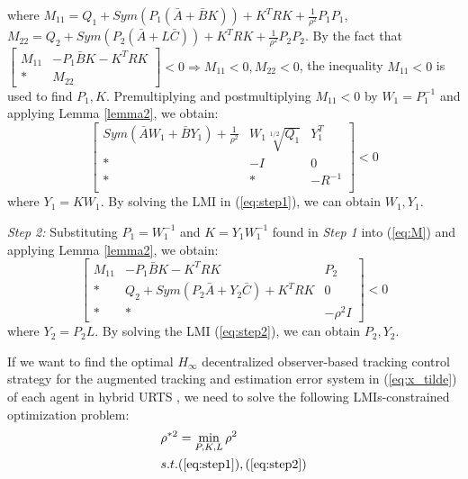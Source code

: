 \documentclass{ieeeaccess}
\begin{document}
where $M_{11}=Q_1+Sym(P_1(\bar{A}+\bar{B}K)) + K^TRK + \frac{1}{\rho^2}P_1P_1$, $M_{22}=Q_2+Sym(P_2(\bar{A}+L\bar{C})) + K^TRK + \frac{1}{\rho^2}P_2P_2$. By the fact that $\begin{bmatrix}
    M_{11} & -P_1\bar{B}K - K^TRK \\ * & M_{22}
\end{bmatrix} < 0 \Rightarrow M_{11}<0, M_{22}<0$, the inequality $M_{11}<0$ is used to find $P_1,K$. Premultiplying and
postmultiplying $M_{11}<0$ by $W_1=P_1^{-1}$ and applying Lemma \ref{lemma2}, we obtain:
\begin{equation} \label{eq:step1}
    \begin{bmatrix}
        Sym(\bar{A}W_1+\bar{B}Y_1) + \frac{1}{\rho^2} & W_1\sqrt[1/2]{Q_1} & Y_1^T \\
        * & -I & 0\\
        * & * & -R^{-1}\\
    \end{bmatrix} < 0
\end{equation}
where $Y_1=KW_1$. By solving the LMI in (\ref{eq:step1}), we can obtain $W_1,Y_1$.

\textit{Step 2:} Substituting $P_1=W_1^{-1}$ and $K=Y_1W_1^{-1}$ found in \textit{Step 1} into (\ref{eq:M}) and applying Lemma \ref{lemma2}, we obtain:
\begin{equation} \label{eq:step2}
    \begin{bmatrix}
        M_{11} & -P_1\bar{B}K - K^TRK & P_2 \\
        * & Q_2+Sym(P_2\bar{A}+Y_2\bar{C}) + K^TRK & 0 \\
        * & * & -\rho^2I
    \end{bmatrix} < 0
\end{equation}
where $Y_2=P_2L$. By solving the LMI (\ref{eq:step2}), we can obtain $P_2,Y_2$.


If we want to find the optimal $H_\infty$ decentralized observer-based tracking control strategy for the augmented tracking and estimation error system in (\ref{eq:x_tilde}) of each agent in hybrid URTS , we need to solve the following LMIs-constrained optimization problem:
\begin{equation} \label{LMI constraint}
    \begin{split}
        & \rho^{*2}=\mathop{\min}_{P,K,L} \rho^2 \\
        & s.t. (\refeq{eq:step1}),(\refeq{eq:step2}) 
    \end{split}
\end{equation}
\end{document}
